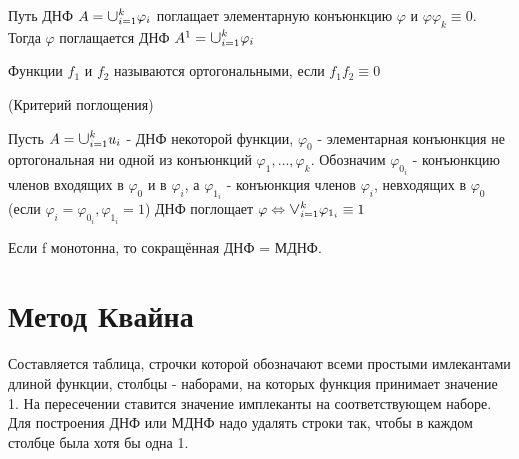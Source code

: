 \lem Путь ДНФ $A = \mathlarger{\mathlarger{\cup}} _{i=1}^k\varphi_i$ поглащает элементарную конъюнкцию $\varphi$ и $\varphi \varphi_k \equiv 0$. Тогда $\varphi$ поглащается ДНФ $A^1=\mathlarger{\mathlarger{\cup}} _{i=1}^k\varphi_i$

\opr Функции $f_1$ и $f_2$ называются ортогональными, если $f_1f_2 \equiv 0$

\thr(Критерий поглощения)\par
Пусть  $A=\mathlarger{\mathlarger{\cup}} _{i=1}^k u_i$ - ДНФ некоторой функции, $\varphi_0$ - элементарная конъюнкция не ортогональная ни одной из конъюнкций $\varphi_1, \dotsc,\varphi_k$. Обозначим $\varphi_{0_i}$ - конъюнкцию членов входящих в $\varphi_0$  и в $\varphi_i$, а $\varphi_{1_i}$ - конъюнкция членов $\varphi_i$, невходящих в $\varphi_0$ (если $\varphi_i = \varphi_{0_i}, \varphi_{1_i} = 1$) ДНФ поглощает $\varphi \Leftrightarrow \mathlarger{\mathlarger{\vee}} _{i=1}^k\varphi_{1_i} \equiv 1$

\utv Если f монотонна, то сокращённая ДНФ = МДНФ.

\section {Метод Квайна}
Составляется таблица, строчки которой обозначают всеми простыми имлекантами длиной функции, столбцы - наборами, на которых функция принимает значение 1. На пересечении ставится значение имплеканты на соответствующем наборе. Для построения ДНФ или МДНФ надо удалять строки так, чтобы в каждом столбце была хотя бы одна 1.
